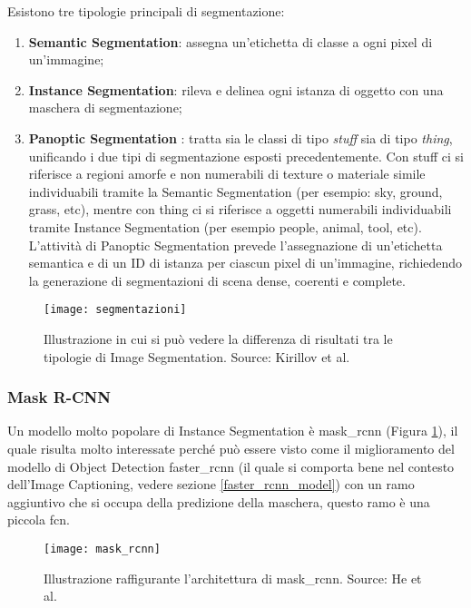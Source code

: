 Esistono tre tipologie principali di segmentazione:
\begin{enumerate}
\item \textbf{Semantic Segmentation}: assegna un'etichetta di classe a ogni pixel di un'immagine;
\item \textbf{Instance Segmentation}: rileva e delinea ogni istanza di oggetto con una maschera di segmentazione;
\item \textbf{Panoptic Segmentation} \cite{kirillov2019panoptic}: tratta sia le classi di tipo \textit{stuff} sia di tipo \textit{thing}, unificando i due tipi di segmentazione esposti precedentemente. 
Con stuff ci si riferisce a regioni amorfe e non numerabili di texture o materiale simile individuabili tramite la Semantic Segmentation (per esempio: sky, ground, grass, etc), mentre con thing ci si riferisce a oggetti numerabili individuabili tramite Instance Segmentation (per esempio people, animal, tool, etc).
L'attività di Panoptic Segmentation prevede l'assegnazione di un'etichetta semantica e di un ID di istanza per ciascun pixel di un'immagine, richiedendo la generazione di segmentazioni di scena dense, coerenti e complete.
\end{enumerate}
\begin{figure}[ht]
\centering
\texttt{[image: segmentazioni]}
\caption{Illustrazione in cui si può vedere la differenza di risultati tra le tipologie di Image Segmentation. Source: Kirillov et al. \cite{kirillov2019panoptic}}
\end{figure}
\newpage
\subsubsection{Mask R-CNN} \label{mask_section}
Un modello molto popolare di Instance Segmentation è \acrshort{mask_rcnn} \cite{he2017mask} (Figura \ref{mask_img}), il quale risulta molto interessate perché può essere visto come il miglioramento del modello di Object Detection \acrshort{faster_rcnn} (il quale si comporta bene nel contesto dell'Image Captioning, vedere sezione \ref{faster_rcnn_model}) con un ramo aggiuntivo che si occupa della predizione della maschera, questo ramo è una piccola \acrfull{fcn}.
\begin{figure}[ht]
\centering
\texttt{[image: mask\_rcnn]}
\caption{Illustrazione raffigurante l'architettura di \acrshort{mask_rcnn}. Source: He et al. \cite{he2017mask}}\label{mask_img}
\end{figure}


